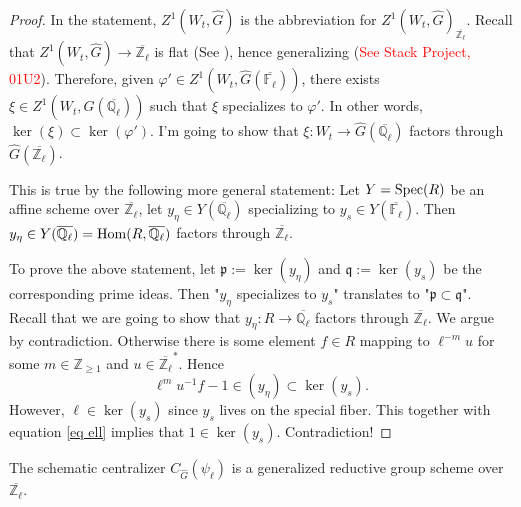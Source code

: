 \begin{proof}
	In the statement, $Z^1(W_t, \hat{G})$ is the abbreviation for $Z^1(W_t, \hat{G})_{\overline{\mathbb{Z}_{\ell}}}$. Recall that $Z^1(W_t, \hat{G}) \to \overline{\mathbb{Z}_{\ell}}$ is flat (See \cite[Proposition 3.3]{dat2022ihes}), hence generalizing (\textcolor{red}{See Stack Project, 01U2}). Therefore, given $\varphi' \in Z^1(W_t, \hat{G}(\overline{\mathbb{F}_{\ell}}))$, there exists $\xi \in Z^1(W_t, \hat{G}(\overline{\mathbb{Q}_{\ell}}))$ such that $\xi$ specializes to $\varphi'$. In other words, $\ker(\xi) \subset \ker(\varphi')$. I'm going to show that $\xi: W_t \to \hat{G}(\overline{\mathbb{Q}_{\ell}})$ factors through  $\hat{G}(\overline{\mathbb{Z}_{\ell}})$.
	
	This is true by the following more general statement: Let $Y=\operatorname{\operatorname{Spec}}(R)$ be an affine scheme over $\overline{\mathbb{Z}_{\ell}}$, let $y_{\eta} \in Y(\overline{\mathbb{Q}_{\ell}})$ specializing to $y_s \in Y(\overline{\mathbb{F}_{\ell}})$.  Then $y_{\eta} \in Y(\overline{\mathbb{Q}_{\ell}})=\operatorname{\operatorname{Hom}}(R, \overline{\mathbb{Q}_{\ell}})$ factors through $\overline{\mathbb{Z}_{\ell}}$.
	
    To prove the above statement, let $\mathfrak{p}:=\ker(y_\eta)$ and $\mathfrak{q}:=\ker(y_s)$ be the corresponding prime ideas. Then "$y_{\eta}$ specializes to $y_s$" translates to "$\mathfrak{p} \subset \mathfrak{q}$". Recall that we are going to show that $y_{\eta}: R \to \overline{\mathbb{Q}_{\ell}}$ factors through $\overline{\mathbb{Z}_{\ell}}$. We argue by contradiction. Otherwise there is some element $f \in R$ mapping to $\ell^{-m}u$ for some $m \in \mathbb{Z}_{\geq 1}$ and $u \in \overline{\mathbb{Z}_{\ell}}^*$. Hence 
    \begin{equation}\label{eq ell}
    	\ell^mu^{-1}f-1 \in (y_{\eta}) \subset \ker(y_s).
    \end{equation}
    However, $\ell \in \ker(y_s)$ since $y_s$ lives on the special fiber. This together with equation \ref{eq ell} implies that $1 \in \ker(y_s)$. Contradiction!
\end{proof}

\begin{lemma}\label{Lem gen red}
	The schematic centralizer $C_{\hat{G}}(\psi_{\ell})$ is a generalized reductive group scheme over $\overline{\mathbb{Z}_{\ell}}$.
\end{lemma}

